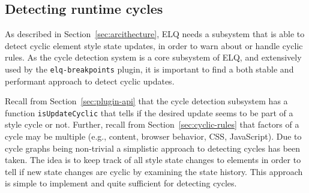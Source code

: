\documentclass[a4paper,11pt]{kth-mag}
\newcommand{\code}[1]{\texttt{#1}}
\begin{document}

      \subsection{Detecting runtime cycles}\label{sec:imp_cycle_detector}
        As described in Section~\ref{sec:arcithecture}, \gls{ELQ} needs a subsystem that is able to detect cyclic element style state updates, in order to warn about or handle cyclic rules.
        As the cycle detection system is a core subsystem of \gls{ELQ}, and extensively used by the \code{elq-breakpoints} plugin, it is important to find a both stable and performant approach to detect cyclic updates.

        Recall from Section~\ref{sec:plugin-api} that the cycle detection subsystem has a function \code{isUpdateCyclic} that tells if the desired update seems to be part of a style cycle or not.
        Further, recall from Section~\ref{sec:cyclic-rules} that factors of a cycle may be multiple (e.g., content, browser behavior, \gls{CSS}, \gls{JavaScript}).
        Due to cycle graphs being non-trivial a simplistic approach to detecting cycles has been taken.
        The idea is to keep track of all style state changes to elements in order to tell if new state changes are cyclic by examining the state history.
        This approach is simple to implement and quite sufficient for detecting cycles.
\end{document}
